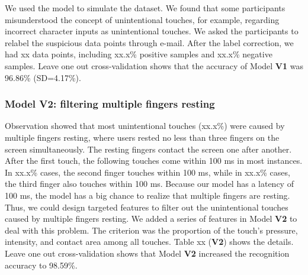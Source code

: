 
We used the model to simulate the dataset. We found that some participants misunderstood the concept of unintentional touches, for example, regarding incorrect character inputs as unintentional touches. We asked the participants to relabel the suspicious data points through e-mail. After the label correction, we had xx data points, including xx.x\% positive samples and xx.x\% negative samples. Leave one out cross-validation shows that the accuracy of Model \textbf{V1} was 96.86\% (SD=4.17\%). 




\subsubsection{Model V2: filtering multiple fingers resting}

Observation showed that most unintentional touches (xx.x\%) were caused by multiple fingers resting, where users rested no less than three fingers on the screen simultaneously. The resting fingers contact the screen one after another. After the first touch, the following touches come within 100 ms in most instances. In xx.x\% cases, the second finger touches within 100 ms, while in xx.x\% cases, the third finger also touches within 100 ms. Because our model has a latency of 100 ms, the model has a big chance to realize that multiple fingers are resting. Thus, we could design targeted features to filter out the unintentional touches caused by multiple fingers resting.
We added a series of features in Model \textbf{V2} to deal with this problem. The criterion was the proportion of the touch's pressure, intensity, and contact area among all touches. Table xx (\textbf{V2}) shows the details. Leave one out cross-validation shows that Model \textbf{V2} increased the recognition accuracy to 98.59\%.

